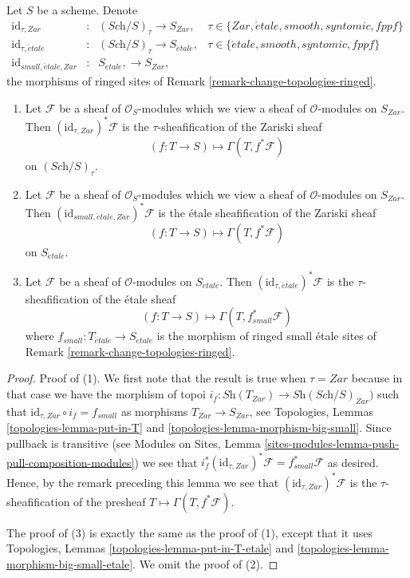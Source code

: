 \begin{lemma}
\label{lemma-compare-sites}
Let $S$ be a scheme. Denote
$$
\begin{matrix}
\text{id}_{\tau, Zar} & : & (\textit{Sch}/S)_\tau \to S_{Zar}, &
\tau \in \{Zar, \acute{e}tale, smooth, syntomic, fppf\} \\
\text{id}_{\tau, \acute{e}tale} & : &
(\textit{Sch}/S)_\tau \to S_{\acute{e}tale}, &
\tau \in \{\acute{e}tale, smooth, syntomic, fppf\} \\
\text{id}_{small, \acute{e}tale, Zar} & : & S_{\acute{e}tale}, \to S_{Zar},
\end{matrix}
$$
the morphisms of ringed sites of
Remark \ref{remark-change-topologies-ringed}.
\begin{enumerate}
\item Let $\mathcal{F}$ be a sheaf of $\mathcal{O}_S$-modules
which we view a sheaf of $\mathcal{O}$-modules on $S_{Zar}$. Then
$(\text{id}_{\tau, Zar})^*\mathcal{F}$ is the $\tau$-sheafification
of the Zariski sheaf
$$
(f : T \to S) \longmapsto \Gamma(T, f^*\mathcal{F})
$$
on $(\textit{Sch}/S)_\tau$.
\item Let $\mathcal{F}$ be a sheaf of $\mathcal{O}_S$-modules
which we view a sheaf of $\mathcal{O}$-modules on $S_{Zar}$. Then
$(\text{id}_{small, \acute{e}tale, Zar})^*\mathcal{F}$ is the
\'etale sheafification of the Zariski sheaf
$$
(f : T \to S) \longmapsto \Gamma(T, f^*\mathcal{F})
$$
on $S_{\acute{e}tale}$.
\item Let $\mathcal{F}$ be a sheaf of $\mathcal{O}$-modules
on $S_{\acute{e}tale}$. Then
$(\text{id}_{\tau, \acute{e}tale})^*\mathcal{F}$ is the $\tau$-sheafification
of the \'etale sheaf
$$
(f : T \to S) \longmapsto \Gamma(T, f_{small}^*\mathcal{F})
$$
where $f_{small} : T_{\acute{e}tale} \to S_{\acute{e}tale}$
is the morphism of ringed small \'etale sites of
Remark \ref{remark-change-topologies-ringed}.
\end{enumerate}
\end{lemma}

\begin{proof}
Proof of (1). We first note that the result is true when $\tau = Zar$
because in that case we have the morphism of topoi
$i_f : \textit{Sh}(T_{Zar}) \to \textit{Sh}(\textit{Sch}/S)_{Zar})$
such that $\text{id}_{\tau, Zar} \circ i_f = f_{small}$ as morphisms
$T_{Zar} \to S_{Zar}$, see
Topologies, Lemmas \ref{topologies-lemma-put-in-T} and
\ref{topologies-lemma-morphism-big-small}.
Since pullback is transitive (see
Modules on Sites,
Lemma \ref{sites-modules-lemma-push-pull-composition-modules})
we see that
$i_f^*(\text{id}_{\tau, Zar})^*\mathcal{F} = f_{small}^*\mathcal{F}$
as desired. Hence, by the remark preceding this lemma we see that
$(\text{id}_{\tau, Zar})^*\mathcal{F}$ is the $\tau$-sheafification of
the presheaf $T \mapsto \Gamma(T, f^*\mathcal{F})$.

\medskip\noindent
The proof of (3) is exactly the same as the proof of (1), except that it
uses
Topologies, Lemmas \ref{topologies-lemma-put-in-T-etale} and
\ref{topologies-lemma-morphism-big-small-etale}.
We omit the proof of (2).
\end{proof}

